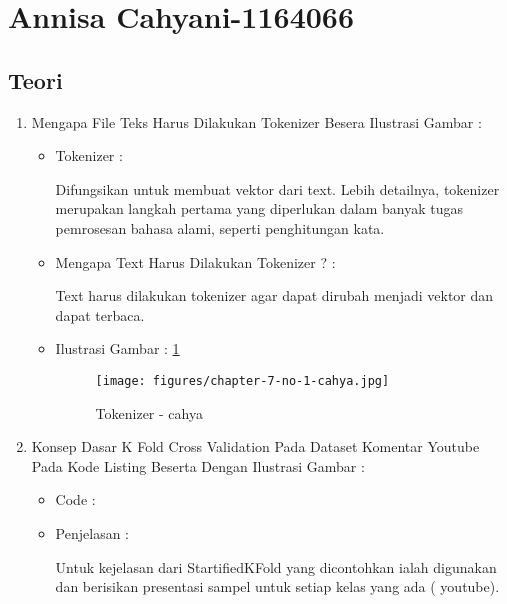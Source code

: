 \section{Annisa Cahyani-1164066}
\subsection{Teori}
\begin{enumerate}
\item Mengapa File Teks Harus Dilakukan Tokenizer Besera Ilustrasi Gambar :
\begin{itemize}
\item Tokenizer :
\par Difungsikan untuk membuat vektor dari text. Lebih detailnya, tokenizer merupakan langkah pertama yang diperlukan dalam banyak tugas pemrosesan bahasa alami, seperti penghitungan kata.
\par
\par
\item Mengapa Text Harus Dilakukan Tokenizer ? :
\par Text harus dilakukan tokenizer agar dapat dirubah menjadi vektor dan dapat terbaca.
\par
\par
\item Ilustrasi Gambar : \ref{chapter-7-no-1-cahya}
\par
\begin{figure}[!hbtp]
\centering
\texttt{[image: figures/chapter-7-no-1-cahya.jpg]}
\caption{Tokenizer - cahya}
\label{chapter-7-no-1-cahya}
\end{figure}
\par
\end{itemize}
\par
\par
\par
\par
\item Konsep Dasar K Fold Cross Validation Pada Dataset Komentar Youtube Pada Kode Listing Beserta Dengan Ilustrasi Gambar :
\begin{itemize}
\item Code		:

\item Penjelasan	: 
\par Untuk kejelasan dari StartifiedKFold yang dicontohkan ialah digunakan dan berisikan presentasi sampel untuk setiap kelas yang ada ( youtube).
\par

\end{itemize}
\end{enumerate}
